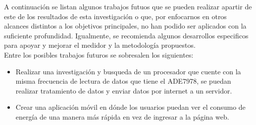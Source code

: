 A continuación se listan algunos trabajos futuos que se pueden realizar apartir de este de los resultados de esta investigación o que, por enfocarnos en otros alcances distintos a los objetivos principales, no han podido ser aplicados con la suficiente profundidad. Igualmente, se recomienda algunos desarrollos especificos para apoyar y mejorar el medidor y la metodología propuestos. \\
Entre los posibles trabajos futuros se sobresalen los siguientes:

\begin{itemize}
    \itemsep0em
    \item Realizar una investigación y busqueda de un procesador que cuente con la misma frecuencia de lectura de datos que tiene el ADE7978, se puedan realizar tratamiento de datos y enviar datos por internet a un servidor.
    \item Crear una aplicación móvil en dónde los usuarios puedan ver el consumo de energía de una manera más rápida en vez de ingresar a la página web.
\end{itemize}